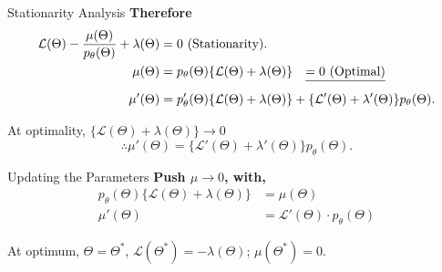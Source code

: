 \documentclass{beamer}
\begin{document}
\begin{frame}{Stationarity Analysis}
    \textbf{Therefore}
    \begin{align*}
        \mathcal{L}(\Theta) - \frac{\mu(\Theta)}{p_{\theta}(\Theta)} + \lambda(\Theta) &= 0 \text{ (Stationarity).} \\
        \mu(\Theta) &= p_{\theta}(\Theta)\{\mathcal{L}(\Theta) + \lambda(\Theta)\} \quad \sout{= 0 \text{ (Optimal)}} \\
        \mu'(\Theta) &= p_{\theta}'(\Theta)\{\mathcal{L}(\Theta) + \lambda(\Theta)\} + \{\mathcal{L}'(\Theta) + \lambda'(\Theta)\}p_{\theta}(\Theta).
    \end{align*}
    
    At optimality, $\{\mathcal{L}(\Theta) + \lambda(\Theta)\} \rightarrow 0$
    \[
        \therefore \mu'(\Theta) = \{\mathcal{L}'(\Theta) + \lambda'(\Theta)\}p_{\theta}(\Theta). 
    \]
    
    \begin{center}
    \end{center}
\end{frame}

\begin{frame}{Updating the Parameters}
    \textbf{Push $\mu \rightarrow 0$, with,}
    \begin{align*}
        p_{\theta}(\Theta)\{\mathcal{L}(\Theta) + \lambda(\Theta)\} &= \mu(\Theta) \\
        \mu'(\Theta) &= \mathcal{L}'(\Theta) \cdot p_{\theta}(\Theta)
    \end{align*}
    
    At optimum, $\Theta = \Theta^*$, $\mathcal{L}(\Theta^*) = -\lambda(\Theta)$; $\mu(\Theta^*) = 0$.
\end{frame}
\end{document}
